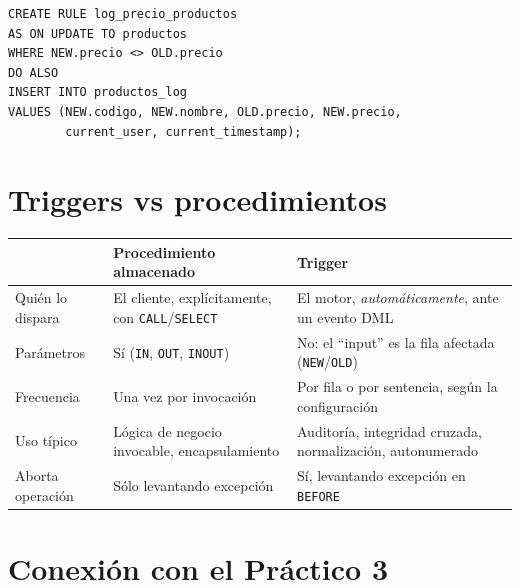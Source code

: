 \documentclass[11pt,a4paper]{article}
\begin{document}
\begin{lstlisting}
CREATE RULE log_precio_productos
AS ON UPDATE TO productos
WHERE NEW.precio <> OLD.precio
DO ALSO
INSERT INTO productos_log
VALUES (NEW.codigo, NEW.nombre, OLD.precio, NEW.precio,
        current_user, current_timestamp);
\end{lstlisting}

\section{Triggers vs procedimientos}

\begin{center}
\begin{tabular}{@{}p{4cm} p{4.5cm} p{5.5cm}@{}}
\toprule
& \textbf{Procedimiento almacenado} & \textbf{Trigger} \\
\midrule
Quién lo dispara &
El cliente, explícitamente, con \texttt{CALL}/\texttt{SELECT} &
El motor, \emph{automáticamente}, ante un evento DML \\
\addlinespace
Parámetros & Sí (\texttt{IN}, \texttt{OUT}, \texttt{INOUT}) &
No: el ``input'' es la fila afectada (\texttt{NEW}/\texttt{OLD}) \\
\addlinespace
Frecuencia & Una vez por invocación &
Por fila o por sentencia, según la configuración \\
\addlinespace
Uso típico & Lógica de negocio invocable, encapsulamiento &
Auditoría, integridad cruzada, normalización, autonumerado \\
\addlinespace
Aborta operación & Sólo levantando excepción &
Sí, levantando excepción en \texttt{BEFORE} \\
\bottomrule
\end{tabular}
\end{center}

\section{Conexión con el Práctico 3}
\end{document}
